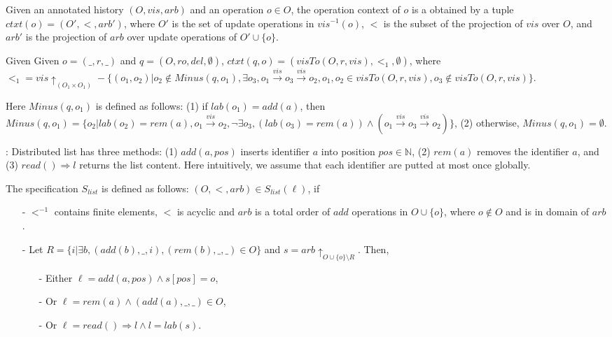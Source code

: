 Given an annotated history $(O,\mathit{vis},\mathit{arb})$ and an operation $o \in O$, the operation context of $o$ is a obtained by a tuple $ctxt(o)=(O',<,\mathit{arb}')$, where $O'$ is the set of update operations in $\mathit{vis}^{-1}(o)$, $<$ is the subset of the projection of $\mathit{vis}$ over $O$, and $\mathit{arb}'$ is the projection of $\mathit{arb}$ over update operations of $O' \cup \{ o \}$. 

Given Given $o=(\_,r,\_)$ and $q=(O,ro,del,\emptyset)$, $ctxt(q,o) = (visTo(O,r,vis),<_1,\emptyset)$, where $<_1 = vis \uparrow_{(O_1 \times O_1)} - \{ (o_1,o_2) \vert o_2 \notin Minus(q,o_1), \exists o_3, o_1 {\xrightarrow{vis}} o_3 {\xrightarrow{vis}} o_2, o_1,o_2 \in visTo(O,r,vis), o_3 \notin visTo(O,r,vis) \}$.

Here $Minus(q,o_1)$ is defined as follows: (1) if $lab(o_1)=add(a)$, then $Minus(q,o_1) = \{o_2 \vert lab(o_2)=rem(a), o_1 {\xrightarrow{vis}} o_2, \neg \exists o_3, ( lab(o_3) = rem(a) ) \wedge ( o_1 {\xrightarrow{vis}} o_3 {\xrightarrow{vis}} o_2 ) \}$, (2) otherwise, $Minus(q,o_1) = \emptyset$.

: Distributed list has three methods: (1) $add(a,pos)$ inserts identifier $a$ into position $pos \in \mathbb{N}$, (2) $rem(a)$ removes the identifier $a$, and  (3) $read() \Rightarrow l$ returns the list content. Here intuitively, we assume that each identifier are putted at most once globally. 

The specification $S_{\mathit{list}}$ is defined as follows: $(O,<,\mathit{arb}) \in S_{\mathit{list}}(\ell)$, if

\begin{itemize}
\setlength{\itemsep}{0.5pt}
\item[-] $<^{-1}$ contains finite elements, $<$ is acyclic and $arb$ is a total order of $add$ operations in $O \cup \{ o \}$, where $o \notin O$ and is in domain of $arb$.

\item[-] Let $R = \{ i \vert \exists b, (add(b),\_,i),(rem(b),\_,\_) \in O \}$ and $s = \mathit{arb} \uparrow_{ O \cup \{ o \} \setminus R }$. Then, 
    
    \begin{itemize}
    \setlength{\itemsep}{0.5pt}
    \item[-] Either $\ell = add(a,pos) \wedge s[pos] = o$, 
    
    \item[-] Or $\ell = rem(a) \wedge (add(a),\_,\_) \in O$, 
    
    \item[-] Or $\ell = read() \Rightarrow l \wedge l = lab(s)$. 
    \end{itemize} 
\end{itemize}

